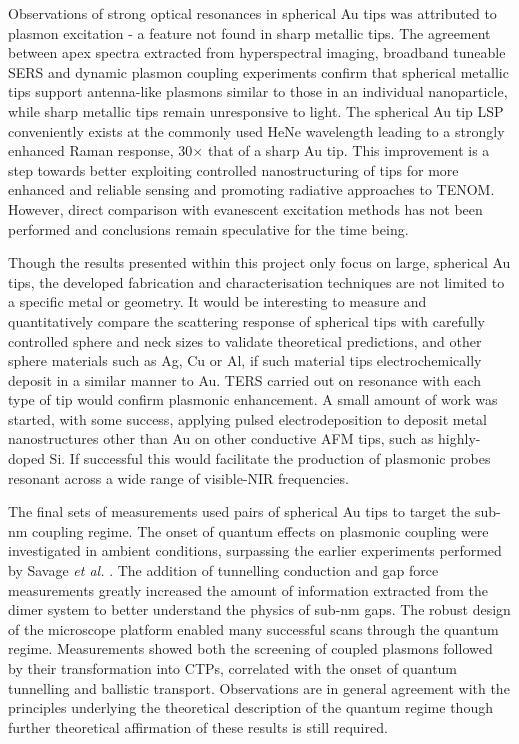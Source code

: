 \documentclass[12pt, a4paper, oneside]{book}
\begin{document}
Observations of strong optical resonances in spherical Au tips was attributed to plasmon excitation - a feature not found in sharp metallic tips. The agreement between apex spectra extracted from hyperspectral imaging, broadband tuneable SERS and dynamic plasmon coupling experiments confirm that spherical metallic tips support antenna-like plasmons similar to those in an individual nanoparticle, while sharp metallic tips remain unresponsive to light. The spherical Au tip LSP conveniently exists at the commonly used HeNe wavelength leading to a strongly enhanced Raman response, 30$\times$ that of a sharp Au tip. This improvement is a step towards better exploiting controlled nanostructuring of tips for more enhanced and reliable sensing and promoting radiative approaches to TENOM. However, direct comparison with evanescent excitation methods has not been performed and conclusions remain speculative for the time being.

Though the results presented within this project only focus on large, spherical Au tips, the developed fabrication and characterisation techniques are not limited to a specific metal or geometry. It would be interesting to measure and quantitatively compare the scattering response of spherical tips with carefully controlled sphere and neck sizes to validate theoretical predictions, and other sphere materials such as Ag, Cu or Al, if such material tips electrochemically deposit in a similar manner to Au. TERS carried out on resonance with each type of tip would confirm plasmonic enhancement. A small amount of work was started, with some success, applying pulsed electrodeposition to deposit metal nanostructures other than Au on other conductive AFM tips, such as highly-doped Si. If successful this would facilitate the production of plasmonic probes resonant across a wide range of visible-NIR frequencies.

The final sets of measurements used pairs of spherical Au tips to target the sub-nm coupling regime. The onset of quantum effects on plasmonic coupling were investigated in ambient conditions, surpassing the earlier experiments performed by Savage \emph{et al.} \cite{savage2012}. The addition of tunnelling conduction and gap force measurements greatly increased the amount of information extracted from the dimer system to better understand the physics of sub-nm gaps. The robust design of the microscope platform enabled many successful scans through the quantum regime. Measurements showed both the screening of coupled plasmons followed by their transformation into CTPs, correlated with the onset of quantum tunnelling and ballistic transport. Observations are in general agreement with the principles underlying the theoretical description of the quantum regime though further theoretical affirmation of these results is still required.
\end{document}
